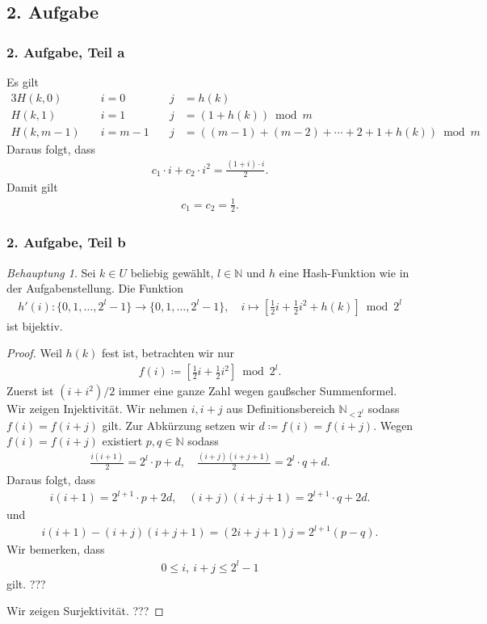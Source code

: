 \documentclass[draft,a5paper]{article}
\theoremstyle{remark}
\newtheorem*{Behauptung}{Behauptung}
\begin{document}
\subsection*{2. Aufgabe}
\subsubsection*{2. Aufgabe, Teil a}
Es gilt
\begin{alignat*}{3}
  H(k, 0) \quad &i=0 \quad &j&=h(k) \\
  H(k, 1) \quad &i=1 \quad &j&=(1+h(k)) \bmod m \\
  H(k, m-1) \quad &i=m-1 \quad &j&=((m-1)+(m-2)+\cdots+2+1+h(k)) \bmod m
\end{alignat*}
Daraus folgt, dass
\begin{align*}c_{1} \cdot i + c_{2} \cdot i^{2} = \frac{(1+i)\cdot i}{2}.\end{align*}
Damit gilt
\begin{align*}c_{1} = c_{2} = \frac{1}{2}.\end{align*}
\subsubsection*{2. Aufgabe, Teil b}
\begin{Behauptung}
  Sei \(k \in U\) beliebig gewählt, \(l \in \mathbb{N}\) und \(h\) eine
  Hash-Funktion wie in der Aufgabenstellung.  Die Funktion
  \begin{align*}h'(i)\colon \{0, 1, \ldots, 2^{l} - 1\} \to \{0, 1, \ldots, 2^{l} - 1\}, \quad i \mapsto
    \left[\frac{1}{2}i + \frac{1}{2}i^{2} + h(k)\right] \bmod 2^{l} \end{align*}
  ist bijektiv.
\end{Behauptung}
\begin{proof}
  Weil \(h(k)\) fest ist, betrachten wir nur
  \begin{align*}f(i) \coloneq \left[\frac{1}{2}i + \frac{1}{2}i^{2}\right] \bmod
    2^{l}. \end{align*} Zuerst ist \((i+i^{2})/2\) immer eine ganze Zahl wegen
  gaußscher Summenformel.  Wir zeigen Injektivität. Wir nehmen
  \(i, i+j\) aus Definitionsbereich \(\mathbb{N}_{< 2^{l}}\) sodass
  \(f(i) = f(i+j)\) gilt.  Zur Abkürzung setzen wir \(d \coloneq f(i) =
  f(i+j)\).  Wegen \(f(i) = f(i+j)\) existiert \(p, q \in \mathbb{N}\) sodass
  \begin{align*}\frac{i(i+1)}{2} = 2^{l} \cdot p + d, \quad \frac{(i+j)(i+j+1)}{2} = 2^{l} \cdot q +
    d.\end{align*} Daraus folgt, dass
  \begin{align*}i(i+1) = 2^{l+1} \cdot p + 2d, \quad (i+j)(i+j+1) = 2^{l+1} \cdot q + 2d.\end{align*}
  und
  \begin{align*}i(i+1) - (i+j)(i+j+1) = (2i+j+1)j = 2^{l+1}(p-q).\end{align*} Wir bemerken,
  dass
  \begin{align*}0 \le i,~ i+j \le 2^{l} - 1\end{align*}
  gilt.  ???

  Wir zeigen Surjektivität. ???
\end{proof}
\newpage
\end{document}

